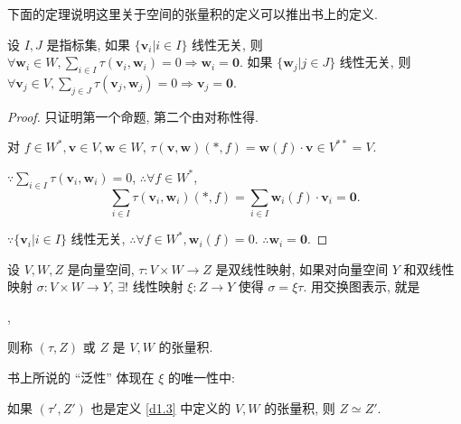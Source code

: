 \documentclass[color=black,device=normal,lang=cn,mode=geye]{elegantnote}
\begin{document}
下面的定理说明这里关于空间的张量积的定义可以推出书上的定义.
\begin{theorem}\label{t1.5}
    设 $I,J$ 是指标集, 如果 $\{\boldsymbol{v}_i|i\in I\}$ 线性无关, 则 $\forall\boldsymbol{w}_i\in W,\sum\limits_{i\in I}\tau(\boldsymbol{v}_i,\boldsymbol{w}_i)=0\Rightarrow\boldsymbol{w}_i=\boldsymbol{0}$. 如果 $\{\boldsymbol{w}_j|j\in J\}$ 线性无关, 则 $\forall\boldsymbol{v}_j\in V,\sum\limits_{j\in J}\tau(\boldsymbol{v}_j,\boldsymbol{w}_j)=0\Rightarrow\boldsymbol{v}_j=\boldsymbol{0}$.
\end{theorem}
\begin{proof}
    只证明第一个命题, 第二个由对称性得.

    对 $f\in W^*,\boldsymbol{v}\in V,\boldsymbol{w}\in W$, $\tau(\boldsymbol{v},\boldsymbol{w})(*,f)=\boldsymbol{w}(f)\cdot\boldsymbol{v}\in V^{**}=V$.

    $\because\sum\limits_{i\in I}\tau(\boldsymbol{v}_i,\boldsymbol{w}_i)=0$, $\therefore\forall f\in W^*$,
    \[\sum\limits_{i\in I}\tau(\boldsymbol{v}_i,\boldsymbol{w}_i)(*,f)=\sum\limits_{i\in I}\boldsymbol{w}_i(f)\cdot\boldsymbol{v}_i=\boldsymbol{0}.\]

    $\because\{\boldsymbol{v}_i|i\in I\}$ 线性无关, $\therefore\forall f\in W^*,\boldsymbol{w}_i(f)=0$. $\therefore\boldsymbol{w}_i=\boldsymbol{0}$.
\end{proof}
\begin{definition}\label{d1.3}
    设 $V,W,Z$ 是向量空间, $\tau:V\times W\to Z$ 是双线性映射, 如果对向量空间 $Y$ 和双线性映射 $\sigma:V\times W\to Y$, $\exists!$ 线性映射 $\xi:Z\to Y$ 使得 $\sigma=\xi\tau$. 用交换图表示, 就是
    \begin{center}
        ,
    \end{center}
    
    则称 $(\tau,Z)$ 或 $Z$ 是 $V,W$ 的张量积.
\end{definition}
书上所说的 ``泛性'' 体现在 $\xi$ 的唯一性中:
\begin{theorem}
    如果 $(\tau',Z')$ 也是定义 \ref{d1.3} 中定义的 $V,W$ 的张量积, 则 $Z\simeq Z'$.
\end{theorem}
\end{document}

